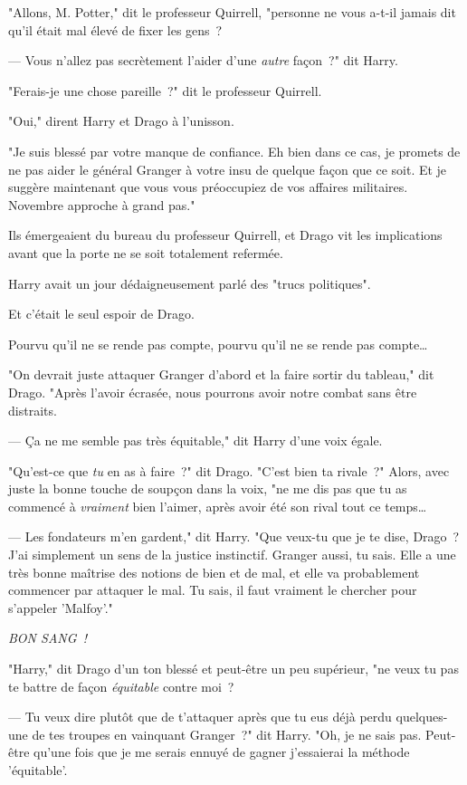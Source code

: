 "Allons, M. Potter," dit le professeur Quirrell, "personne ne vous a-t-il jamais dit qu'il était mal élevé de fixer les gens~?

--- Vous n'allez pas secrètement l'aider d'une \emph{autre} façon~?" dit Harry.

"Ferais-je une chose pareille~?" dit le professeur Quirrell.

"Oui," dirent Harry et Drago à l'unisson.

"Je suis blessé par votre manque de confiance. Eh bien dans ce cas, je promets de ne pas aider le général Granger à votre insu de quelque façon que ce soit. Et je suggère maintenant que vous vous préoccupiez de vos affaires militaires. Novembre approche à grand pas."

\later

Ils émergeaient du bureau du professeur Quirrell, et Drago vit les implications avant que la porte ne se soit totalement refermée.

Harry avait un jour dédaigneusement parlé des "trucs politiques".

Et c'était le seul espoir de Drago.

Pourvu qu'il ne se rende pas compte, pourvu qu'il ne se rende pas compte…

"On devrait juste attaquer Granger d'abord et la faire sortir du tableau," dit Drago. "Après l'avoir écrasée, nous pourrons avoir notre combat sans être distraits.

--- Ça ne me semble pas très équitable," dit Harry d'une voix égale.

"Qu'est-ce que \emph{tu} en as à faire~?" dit Drago. "C'est bien ta rivale~?" Alors, avec juste la bonne touche de soupçon dans la voix, "ne me dis pas que tu as commencé à \emph{vraiment} bien l'aimer, après avoir été son rival tout ce temps…

--- Les fondateurs m'en gardent," dit Harry. "Que veux-tu que je te dise, Drago~? J'ai simplement un sens de la justice instinctif. Granger aussi, tu sais. Elle a une très bonne maîtrise des notions de bien et de mal, et elle va probablement commencer par attaquer le mal. Tu sais, il faut vraiment le chercher pour s'appeler 'Malfoy'."

\emph{BON SANG~!}

"Harry," dit Drago d'un ton blessé et peut-être un peu supérieur, "ne veux tu pas te battre de façon \emph{équitable} contre moi~?

--- Tu veux dire plutôt que de t'attaquer après que tu eus déjà perdu quelques-une de tes troupes en vainquant Granger~?" dit Harry. "Oh, je ne sais pas. Peut-être qu'une fois que je me serais ennuyé de gagner j'essaierai la méthode 'équitable'.

